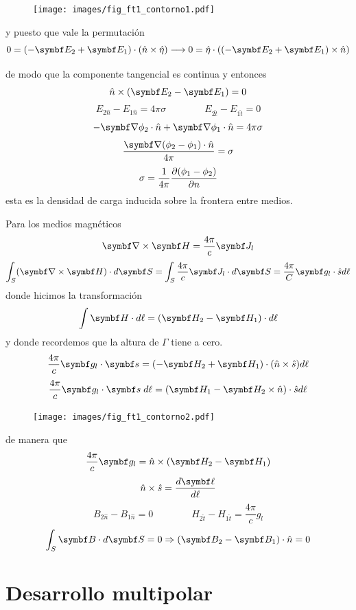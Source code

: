 \documentclass[10pt,oneside]{CBFT_book}
\begin{document}
\begin{figure}[htb]
	\begin{center}
	\texttt{[image: images/fig\_ft1\_contorno1.pdf]}	 
	\end{center}
	\caption{}
\end{figure} 
y puesto que vale la permutación
\[
	0 = ( -\vb{E}_2 + \vb{E}_1 )\cdot(\hat{n}\times\hat{\eta}) \longrightarrow 
	0 = \hat{\eta} \cdot ( ( -\vb{E}_2 + \vb{E}_1 ) \times \hat{n} )
\]

de modo que la componente tangencial es continua y entonces
\[
	\hat{n} \times ( \vb{E}_2 - \vb{E}_1 ) = 0
\]
\[
	E_{2\hat{n}} - E_{1\hat{n}} = 4 \pi \sigma \qquad \qquad E_{2\hat{t}} -E_{1\hat{t}} = 0
\]
\[
	-\Nabla\phi_2\cdot\hat{n} + \Nabla\phi_1\cdot\hat{n} = 4 \pi \sigma
\]
\[
	\frac{\Nabla(\phi_2-\phi_1)\cdot \hat{n}}{4 \pi} = \sigma
\]
\[
	\sigma = \frac{1}{4\pi}\frac{\partial^{\hspace{-0.05em}} {(\phi_1-\phi_2)}}{\partial {n}^{\hspace{-0.05em}}}
\]
esta es la densidad de carga inducida sobre la frontera entre medios.

Para los medios magnéticos
\[
	\rotorm{H} = \frac{4 \pi}{c} \vb{J}_l
\]
\[
	\int_S (\rotorm{H}) \cdot d\vb{S} = \int_S \frac{4 \pi}{c} \vb{J}_l \cdot d\vb{S} = 
	\frac{4 \pi}{C} \vb{g}_l\cdot \hat{s} d\ell
\]
donde hicimos la transformación
\[
	\int \vb{H}\cdot d\ell = (\vb{H}_2-\vb{H}_1)\cdot d\ell
\]
y donde recordemos que la altura de $\Gamma$ tiene a cero.
\[
	\frac{4 \pi}{c} \vb{g}_l \cdot \vb{s} = ( -\vb{H}_2 + \vb{H}_1 )\cdot( \hat{n} \times \hat{s} ) d\ell
\]
\[
	\frac{4 \pi}{c} \vb{g}_l \cdot \vb{s} \; d\ell = (\vb{H}_1 -\vb{H}_2 \times \hat{n})\cdot \hat{s} 
d\ell
\]

\begin{figure}[htb]
	\begin{center}
	\texttt{[image: images/fig\_ft1\_contorno2.pdf]}	 
	\end{center}
	\caption{}
\end{figure} 

de manera que 
\[
	\frac{4 \pi}{c} \vb{g}_l = \hat{n} \times ( \vb{H}_2 - \vb{H}_1 )
\]
\[
	\hat{n}\times\hat{s} = \frac{d\vb{\ell}}{d\ell} 
\]
\[
	B_{2\hat{n}} - B_{1\hat{n}} = 0 \qquad \qquad H_{2\hat{t}} - H_{1\hat{t}} = \frac{4 \pi}{c} g_l
\]
\[
	\int_S \vb{B}\cdot d\vb{S} = 0 \Rightarrow (\vb{B}_2 - \vb{B}_1 )\cdot\hat{n} = 0
\]

\section{Desarrollo multipolar}
\end{document}
